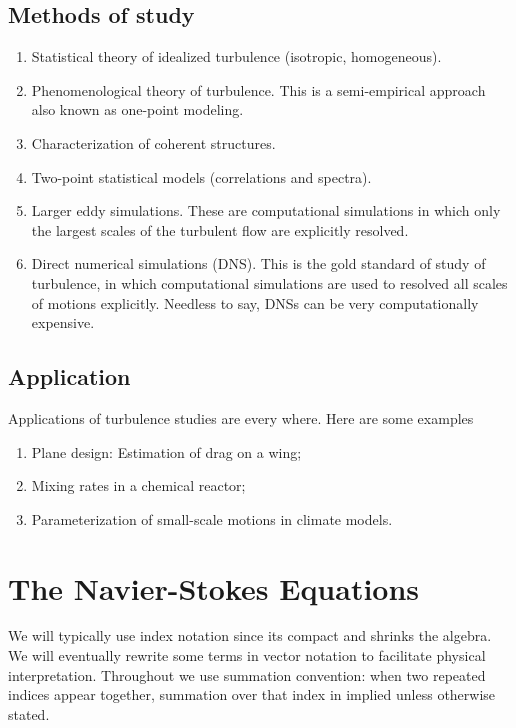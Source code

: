 \documentclass[11pt]{article}
\begin{document}
\subsection{Methods of study}

\begin{enumerate}

        \item Statistical theory of idealized turbulence (isotropic, homogeneous).

        \item Phenomenological theory of turbulence. This is a semi-empirical approach also known as one-point modeling.

        \item Characterization of coherent structures.

        \item Two-point statistical models (correlations and spectra).

        \item Larger eddy simulations. These are computational simulations in which only the largest scales of the turbulent flow are explicitly resolved.

        \item Direct numerical simulations (DNS). This is the gold standard of study of turbulence, in which computational simulations are used to resolved all scales of motions explicitly. Needless to say, DNSs can be very computationally expensive.

\end{enumerate}

\subsection{Application}
Applications of turbulence studies are every where. Here are some examples

\begin{enumerate}
    \item Plane design: Estimation of drag on a wing;
    \item Mixing rates in a chemical reactor;
    \item Parameterization of small-scale motions in climate models.
\end{enumerate}

\section{The Navier-Stokes Equations}
We will typically use index notation since its compact and shrinks the algebra. We will eventually rewrite some terms in vector notation to facilitate physical interpretation. Throughout we use summation convention: when two repeated indices appear together, summation over that index in implied unless otherwise stated. 
\end{document}
